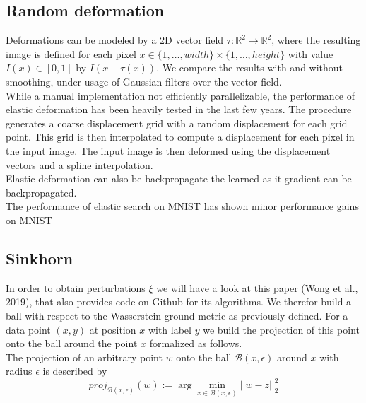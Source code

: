 \documentclass[]{article}
\begin{document}
\subsection{Random deformation}
Deformations can be modeled by a 2D vector field $\tau: \mathbb{R}^2 \rightarrow \mathbb{R}^2$, where the resulting image is defined for each pixel $x\in\{1,\dots,width\}\times\{1,\dots,height\}$ with value $I(x)\in[0,1]$ by $I(x + \tau(x))$. We compare the results with and without smoothing, under usage of Gaussian filters over the vector field.\\

While a manual implementation not efficiently parallelizable, the performance of elastic deformation has been heavily tested in the last few years. The procedure generates a coarse displacement grid with a random displacement for each grid point. This grid is then interpolated to compute a displacement for each pixel in the input image. The input image is then deformed using the displacement vectors and a spline interpolation. \cite{elastic1}\cite{elastic2} \\
 
Elastic deformation can also be backpropagate the learned as it gradient can be backpropagated.\\

The performance of elastic search on MNIST has shown minor performance gains on MNIST\cite{MNISTElastic}

\subsection{Sinkhorn}

In order to obtain perturbations $\xi$ we will have a look at \href{http://proceedings.mlr.press/v97/wong19a/wong19a.pdf}{this paper} (Wong et al., 2019), that also provides code on Github for its algorithms. We therefor build a ball with respect to the Wasserstein ground metric as previously defined. For a data point $(x,y)$ at position $x$ with label $y$ we build the projection of this point onto the ball around the point $x$ formalized as follows.\\

The projection of an arbitrary point $w$ onto the ball $\mathcal{B}(x,\epsilon)$ around $x$ with radius $\epsilon$ is described by
\begin{equation}
	proj_{\mathcal{B}(x,\epsilon)}(w):=\arg \min_{x\in\mathcal{B}(x,\epsilon)}||w-z||^2_2
\end{equation}
\end{document}
